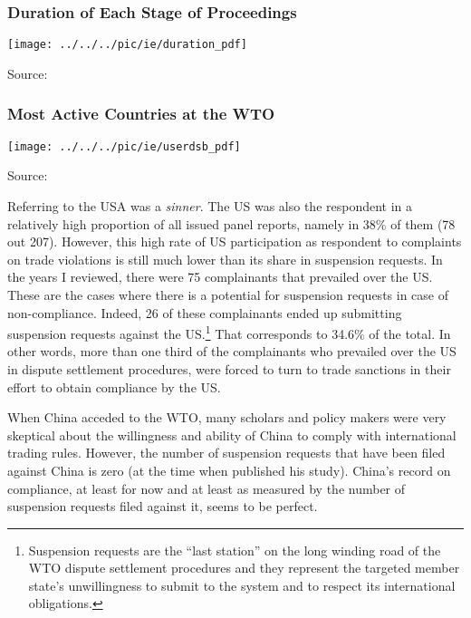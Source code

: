 \subsubsection*{Duration of Each Stage of Proceedings}
\begin{center}
	\texttt{[image: ../../../pic/ie/duration\_pdf]}
\end{center}
Source: \cite{Johannesson2017WTO}

\subsubsection*{Most Active Countries at the WTO}
\begin{center}
	\texttt{[image: ../../../pic/ie/userdsb\_pdf]}
\end{center}
Source: \citet{Reich2017effectiveness}

Referring to \citet{Reich2017effectiveness} the USA was a \textit{sinner}.
The US was also the respondent in a relatively high proportion of all issued panel reports, namely in 38\% of them (78 out 207). However, this high rate of US participation as respondent to
complaints on trade violations is still much lower than its share in suspension requests. In the years I reviewed, there were 75 complainants that prevailed over the US.  These are the cases where there
is a potential for suspension requests in case of non-compliance. Indeed, 26 of these complainants ended
up submitting suspension requests against the US.\footnote{Suspension requests are the “last station” on the long winding road of the WTO dispute settlement
	procedures and they represent the targeted member state’s unwillingness to submit to the system and to
	respect its international obligations.} That corresponds to 34.6\% of the total. In other
words, more than one third of the complainants who prevailed over the US in dispute settlement
procedures, were forced to turn to trade sanctions in their effort to obtain compliance by the US.

When China acceded to the WTO, many scholars and policy makers were very skeptical about the willingness and ability of China to comply with international trading rules.
However, the number of suspension requests that have been filed against China is zero (at the time when \cite{Reich2017effectiveness} published his study).
China’s record on compliance, at least for now and at least as measured by the number of suspension requests filed against it, seems to be perfect.

